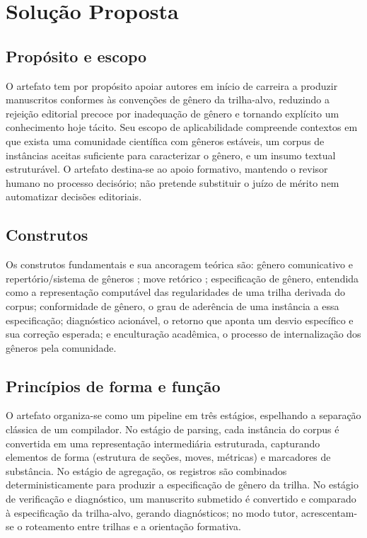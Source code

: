 


\chapter{Solução Proposta}\label{chap:Uma Teoria de Design para um Tutor de Gêneros Científicos}


\section{Propósito e escopo}

O artefato tem por propósito apoiar autores em início de carreira a produzir manuscritos conformes às convenções de gênero da trilha-alvo, reduzindo a rejeição editorial precoce por inadequação de gênero e tornando explícito um conhecimento hoje tácito. Seu escopo de aplicabilidade compreende contextos em que exista uma comunidade científica com gêneros estáveis, um corpus de instâncias aceitas suficiente para caracterizar o gênero, e um insumo textual estruturável. O artefato destina-se ao apoio formativo, mantendo o revisor humano no processo decisório; não pretende substituir o juízo de mérito nem automatizar decisões editoriais.

\section{Construtos}

Os construtos fundamentais e sua ancoragem teórica são: gênero comunicativo e repertório/sistema de gêneros \cite{GenresOrgComm,GenreSystems}; move retórico \cite{GenreAnalysis}; especificação de gênero, entendida como a representação computável das regularidades de uma trilha derivada do corpus; conformidade de gênero, o grau de aderência de uma instância a essa especificação; diagnóstico acionável, o retorno que aponta um desvio específico e sua correção esperada; e enculturação acadêmica, o processo de internalização dos gêneros pela comunidade.

\section{Princípios de forma e função}

O artefato organiza-se como um pipeline em três estágios, espelhando a separação clássica de um compilador. No estágio de parsing, cada instância do corpus é convertida em uma representação intermediária estruturada, capturando elementos de forma (estrutura de seções, moves, métricas) e marcadores de substância. No estágio de agregação, os registros são combinados deterministicamente para produzir a especificação de gênero da trilha. No estágio de verificação e diagnóstico, um manuscrito submetido é convertido e comparado à especificação da trilha-alvo, gerando diagnósticos; no modo tutor, acrescentam-se o roteamento entre trilhas e a orientação formativa.

